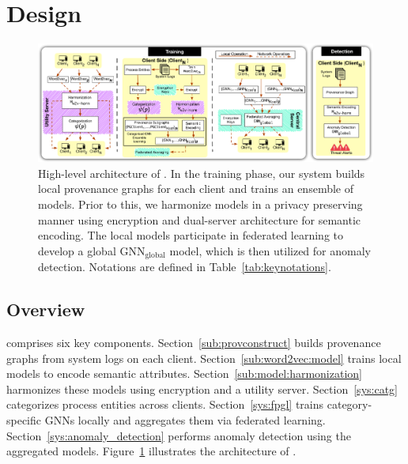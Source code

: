 \section{Design}
\label{sec:methodology}




\begin{figure}[t!]
  \centering
  \includegraphics[width=1\textwidth]{fig/archv7.pdf}
  \caption{High-level architecture of \Sys. In the training phase, our system builds local provenance graphs for each client and trains an ensemble of \gnnshort models. Prior to this, we harmonize \wordvec models in a privacy preserving manner using encryption and dual-server architecture for semantic encoding. The local \gnnshort models participate in federated learning to develop a global \( {\text{GNN}}_{\text{global}} \) model, which is then utilized for anomaly detection. Notations are defined in Table~\ref{tab:keynotations}.}
  \vspace{-3ex}
  \label{fig:arch}
\end{figure}


\subsection{Overview}
\Sys comprises six key components. Section~\ref{sub:provconstruct} builds provenance graphs from system logs on each client. Section~\ref{sub:word2vec:model} trains local \wordvec models to encode semantic attributes. Section~\ref{sub:model:harmonization} harmonizes these models using encryption and a utility server. Section~\ref{sys:catg} categorizes process entities across clients. Section~\ref{sys:fpgl} trains category-specific GNNs locally and aggregates them via federated learning. Section~\ref{sys:anomaly_detection} performs anomaly detection using the aggregated models. Figure~\ref{fig:arch} illustrates the architecture of \Sys.


